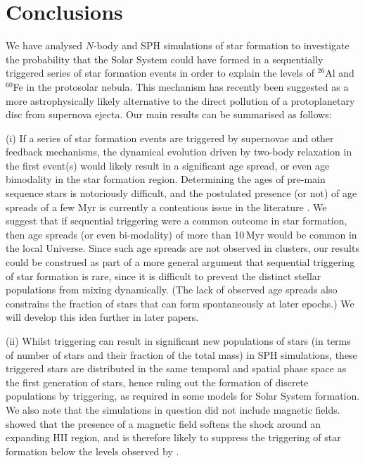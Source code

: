 \documentclass[useAMS,usenatbib,usegraphicx]{mn2e}
\begin{document}
\section{Conclusions}
\label{conclude}

We have analysed $N$-body and SPH simulations of star formation to investigate the probability that the Solar System could have formed in a sequentially triggered series of star formation events in order to explain the levels of $^{26}$Al and $^{60}$Fe in the protosolar nebula. This mechanism has recently been suggested as a more astrophysically likely alternative to the direct pollution of a protoplanetary disc from supernova ejecta. Our main results can be summarised as follows:

(i) If a series of star formation events are triggered by supernovae and other feedback mechanisms, the dynamical evolution driven by two-body relaxation in the first event(s) would likely result in a significant age spread, or even age bimodality in the star formation region. Determining the ages of pre-main sequence stars is notoriously difficult, and the postulated presence (or not) of age spreads of a few Myr is currently a contentious issue in the literature \citep{Soderblom14}.  We suggest that if sequential triggering were a common outcome in star formation, then age spreads (or even bi-modality) of more than 10\,Myr would be common in the local Universe. Since such age spreads are not observed in clusters, our results could be construed as part of a more general argument that sequential triggering of star formation is rare, since it is difficult to prevent the distinct stellar populations from mixing dynamically. (The lack of observed age spreads also constrains the fraction of stars that can form spontaneously at later epochs.) We will develop this idea further in later papers.

(ii) Whilst triggering can result in significant new populations of stars (in terms of number of stars and their fraction of the total mass) in SPH simulations, these triggered stars are distributed in the same temporal and spatial phase space as the first generation of stars, hence ruling out the formation of discrete  populations by triggering, as required in some models for Solar System formation. We also note that the simulations in question did not include magnetic fields. \cite{Krumholz07} showed that the presence of a magnetic field softens the shock around an expanding H{\small II} region, and is therefore likely to suppress the triggering of star formation below the levels observed by \cite{Dale13b}.
\end{document}

